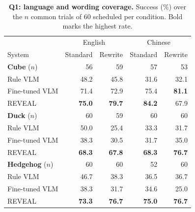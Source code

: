 \begin{table}[!htbp]
\centering\small
\setlength{\tabcolsep}{2pt}
\begin{tabular*}{\linewidth}{@{}l@{\extracolsep{\fill}}rrrr@{}}
\toprule
 & \multicolumn{2}{c}{English} & \multicolumn{2}{c}{Chinese}\\
System & Standard & Rewrite & Standard & Rewrite\\
\midrule
\textbf{Cube} ($n$) & 56 & 59 & 57 & 53\\
Rule VLM & 48.2 & 45.8 & 31.6 & 32.1\\
Fine-tuned VLM & 71.4 & 72.9 & 75.4 & \textbf{81.1}\\
REVEAL & \textbf{75.0} & \textbf{79.7} & \textbf{84.2} & 67.9\\
\midrule
\textbf{Duck} ($n$) & 60 & 59 & 60 & 60\\
Rule VLM & 50.0 & 25.4 & 33.3 & 31.7\\
Fine-tuned VLM & 38.3 & 30.5 & 31.7 & 35.0\\
REVEAL & \textbf{68.3} & \textbf{67.8} & \textbf{68.3} & \textbf{76.7}\\
\midrule
\textbf{Hedgehog} ($n$) & 60 & 60 & 52 & 60\\
Rule VLM & 46.7 & 38.3 & 36.5 & 36.7\\
Fine-tuned VLM & 38.3 & 31.7 & 34.6 & 25.0\\
REVEAL & \textbf{73.3} & \textbf{76.7} & \textbf{75.0} & \textbf{76.7}\\
\bottomrule
\end{tabular*}
\caption{\textbf{Q1: language and wording coverage.} Success (\%) over the $n$ common trials of 60 scheduled per condition. Bold marks the highest rate.}
\label{tab:language-objects}
\end{table}
